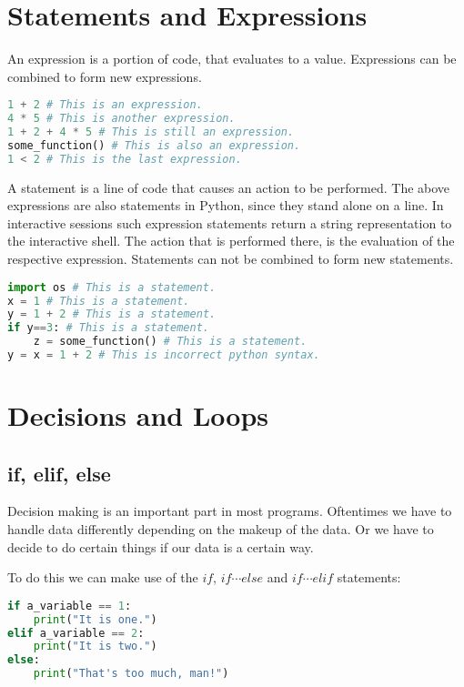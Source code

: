 \documentclass{article}
\begin{document}
\section{Statements and Expressions}

An expression is a portion of code, that evaluates to a value.
Expressions can be combined to form new expressions.
\begin{lstlisting}[language=Python]
1 + 2 # This is an expression.
4 * 5 # This is another expression.
1 + 2 + 4 * 5 # This is still an expression.
some_function() # This is also an expression.
1 < 2 # This is the last expression.
\end{lstlisting}

A statement is a line of code that causes an action to be performed.
The above expressions are also statements in Python, since they stand alone on a line.
In interactive sessions such expression statements return a string representation to the interactive shell. 
The action that is performed there, is the evaluation of the respective expression.
Statements can not be combined to form new statements.

\begin{lstlisting}[language=Python]
import os # This is a statement.
x = 1 # This is a statement.
y = 1 + 2 # This is a statement.
if y==3: # This is a statement.
    z = some_function() # This is a statement. 
y = x = 1 + 2 # This is incorrect python syntax.
\end{lstlisting}


\section{Decisions and Loops}

\subsection{if, elif, else}

Decision making is an important part in most programs.
Oftentimes we have to handle data differently depending on
the makeup of the data.
Or we have to decide to do certain things if our data is a certain way.

To do this we can make use of the $if$, $if\cdots else$ and $if\cdots elif$
statements:

\begin{lstlisting}[language=Python]
if a_variable == 1:
    print("It is one.")
elif a_variable == 2:
    print("It is two.")
else:
    print("That's too much, man!")
\end{lstlisting}
\end{document}
